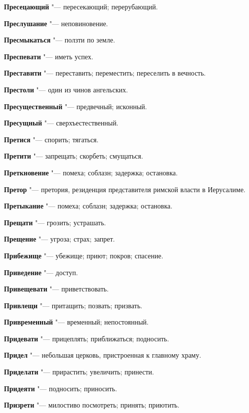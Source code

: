 \begin{mymulticols}
\noindent\textbf{Пресецающий} "--- пересекающий; перерубающий. 

\noindent\textbf{Преслушание} "--- неповиновение. 

\noindent\textbf{Пресмыкаться} "--- ползти по земле. 

\noindent\textbf{Преспевати} "--- иметь успех. 

\noindent\textbf{Преставити} "--- переставить; переместить; переселить в вечность. 

\noindent\textbf{Престоли} "--- один из чинов ангельских. 

\noindent\textbf{Пресущественный} "--- предвечный; исконный. 

\noindent\textbf{Пресущный} "--- сверхъестественный. 

\noindent\textbf{Претися} "--- спорить; тягаться. 

\noindent\textbf{Претити} "--- запрещать; скорбеть; смущаться. 

\noindent\textbf{Преткновение} "--- помеха; соблазн; задержка; остановка. 

\noindent\textbf{Претор} "--- претория, резиденция представителя римской власти в Иерусалиме. 

\noindent\textbf{Претыкание} "--- помеха; соблазн; задержка; остановка. 

\noindent\textbf{Прещати} "--- грозить; устрашать. 

\noindent\textbf{Прещение} "--- угроза; страх; запрет. 

\noindent\textbf{Прибежище} "--- убежище; приют; покров; спасение. 

\noindent\textbf{Приведение} "--- доступ. 

\noindent\textbf{Привещевати} "--- приветствовать. 

\noindent\textbf{Привлещи} "--- притащить; позвать; призвать. 

\noindent\textbf{Привременный} "--- временный; непостоянный. 

\noindent\textbf{Придевати} "--- прицеплять; приближаться; подносить. 

\noindent\textbf{Придел} "--- небольшая церковь, пристроенная к главному храму. 

\noindent\textbf{Приделати} "--- прирастить; увеличить; принести. 

\noindent\textbf{Придеяти} "--- подносить; приносить. 

\noindent\textbf{Призрети} "--- милостиво посмотреть; принять; приютить. 


\end{mymulticols}
